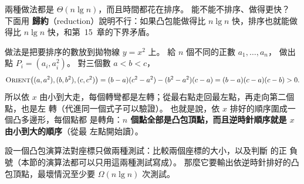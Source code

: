 兩種做法都是 $\Theta(n \lg n)$，而且時間都花在排序。 能不能不排序、做得更快？ 下面用
\textbf{歸約}（reduction）說明不行：如果凸包能做得比 $n \lg n$ 快，排序也就能做得比
$n \lg n$ 快，和第~15~章的下界矛盾。

做法是把要排序的數放到拋物線 $y = x^2$ 上。 給 $n$ 個不同的正數 $a_1, \ldots, a_n$，
做出點 $P_i = (a_i, a_i^2)$。 對三個數 $a < b < c$，
\[
\proc{Orient}\bigl((a, a^2), (b, b^2), (c, c^2)\bigr)
= (b - a)(c^2 - a^2) - (b^2 - a^2)(c - a) = (b - a)(c - a)(c - b) > 0 .
\]
所以依 $x$ 由小到大走，每個轉彎都是左轉；從最右點走回最左點，再走向第二個點，也是左
轉（代進同一個式子可以驗證）。 也就是說，依 $x$ 排好的順序圍成一個凸多邊形，每個點都
是轉角：\textbf{$n$ 個點全部是凸包頂點，而且逆時針順序就是 $x$ 由小到大的順序}（從最
左點開始讀）。

\begin{center}
\begin{minipage}{\linewidth}
\centering
{}
\label{fig:dc-parabola}
\end{minipage}
\end{center}

\begin{theorem}
\label{thm:dc-hull-lower}
設一個凸包演算法對座標只做兩種測試：比較兩個座標的大小，以及判斷  的正
負號（本節的演算法都可以只用這兩種測試寫成）。 那麼它要輸出依逆時針排好的凸包頂點，最壞情況至少要
$\Omega(n \lg n)$ 次測試。
\end{theorem}

